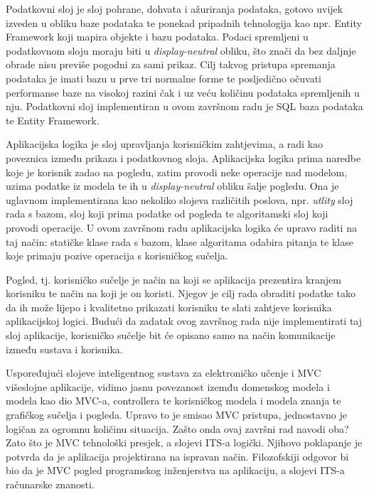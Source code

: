 \documentclass[times, utf8, zavrsni]{fer}
\begin{document}
\par
Podatkovni sloj je sloj pohrane, dohvata i ažuriranja podataka, gotovo uvijek izveden u obliku baze podataka te ponekad pripadnih tehnologija kao npr. Entity Framework koji mapira objekte i bazu podataka. Podaci spremljeni u podatkovnom sloju moraju biti u \textit{display-neutral} obliku, što znači da bez daljnje obrade nisu previše pogodni za sami prikaz. Cilj takvog pristupa spremanja podataka je imati bazu u prve tri normalne forme te posljedično očuvati performanse baze na visokoj razini čak i uz veću količinu podataka spremljenih u nju. Podatkovni sloj implementiran u ovom završnom radu je SQL baza podataka te Entity Framework.
\par
Aplikacijska logika je sloj upravljanja korisničkim zahtjevima, a radi kao poveznica između prikaza i podatkovnog sloja. Aplikacijska logika prima naredbe koje je korisnik zadao na pogledu, zatim provodi neke operacije nad modelom, uzima podatke iz modela te ih u \textit{display-neutral} obliku šalje pogledu. Ona je uglavnom implementirana kao nekoliko slojeva različitih poslova, npr. \textit{utlity} sloj rada s bazom, sloj koji prima podatke od pogleda te algoritamski sloj koji provodi operacije. U ovom završnom radu aplikacijska logika će upravo raditi na taj način: statičke klase rada s bazom, klase algoritama odabira pitanja te klase koje primaju pozive operacija s korisničkog sučelja.
\par
Pogled, tj. korisničko sučelje je način na koji se aplikacija prezentira kranjem korisniku te način na koji je on koristi. Njegov je cilj rada obraditi podatke tako da ih može lijepo i kvalitetno prikazati korisniku te slati zahtjeve korisnika aplikacijskoj logici. Budući da zadatak ovog završnog rada nije implementirati taj sloj aplikacije, korisničko sučelje bit će opisano samo na način komunikacije između sustava i korisnika.
\par
Uspoređujući slojeve inteligentnog sustava za elektroničko učenje i MVC višeslojne aplikacije, vidimo jasnu povezanost izemđu domenskog modela i modela kao dio MVC-a, controllera te korisničkog modela i modela znanja te grafičkog sučelja i pogleda. Upravo to je smisao MVC pristupa, jednostavno je logičan za ogromnu količinu situacija. Zašto onda ovaj završni rad navodi oba? Zato što je MVC tehnološki presjek, a slojevi ITS-a logički. Njihovo poklapanje je potvrda da je aplikacija projektirana na ispravan način. Filozofskiji odgovor bi bio da je MVC pogled programskog inženjerstva na aplikaciju, a slojevi ITS-a računarske znanosti.
\end{document}
